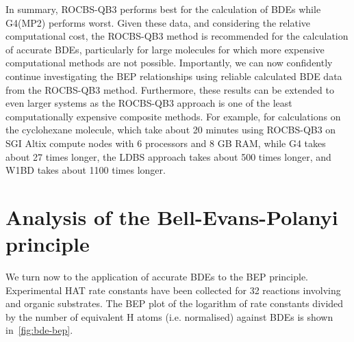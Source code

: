 In summary, ROCBS-QB3 performs best for the calculation of  BDEs while G4(MP2) performs worst. Given these data, and considering the relative computational cost, the ROCBS-QB3 method is recommended for the calculation of accurate BDEs, particularly for large molecules for which more expensive computational methods are not possible. Importantly, we can now confidently continue investigating the BEP relationships using reliable calculated BDE data from the ROCBS-QB3 method. Furthermore, these results can be extended to even larger systems as the ROCBS-QB3 approach is one of the least computationally expensive composite methods. For example, for calculations on the cyclohexane molecule, which take about 20 minutes using ROCBS-QB3 on SGI Altix compute nodes with 6 processors and 8 GB RAM, while G4 takes about 27 times longer, the LDBS approach takes about 500 times longer, and W1BD takes about 1100 times longer.

\section{Analysis of the Bell-Evans-Polanyi principle}

We turn now to the application of accurate BDEs to the BEP principle. Experimental HAT rate constants have been collected for 32 reactions involving \cumo and organic substrates. The BEP plot of the logarithm of rate constants divided by the number of equivalent H atoms (i.e. normalised) against BDEs is shown in~\ref{fig:bde-bep}.

